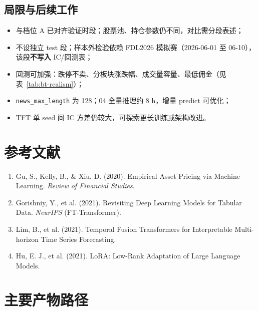 \documentclass[UTF8,a4paper,12pt]{ctexart}
\begin{document}
\subsection{局限与后续工作}

\begin{itemize}[leftmargin=2em]
  \item 与档位 A 已对齐验证时段；股票池、持仓参数仍不同，对比需分段表述；
  \item 不设独立 test 段；样本外检验依赖 FDL2026 模拟赛（2026-06-01 至 06-10），该段\textbf{不写入} IC/回测表；
  \item 回测可加强：跌停不卖、分板块涨跌幅、成交量容量、最低佣金（见表~\ref{tab:bt-realism}）；
  \item \texttt{news\_max\_length} 为 128；04 全量推理约 8 h，增量 predict 可优化；
  \item TFT 单 seed 间 IC 方差仍较大，可探索更长训练或架构改进。
\end{itemize}

\section*{参考文献}
\begin{enumerate}[leftmargin=2em]
  \item Gu, S., Kelly, B., \& Xiu, D. (2020). Empirical Asset Pricing via Machine Learning. \textit{Review of Financial Studies}.
  \item Gorishniy, Y., et al. (2021). Revisiting Deep Learning Models for Tabular Data. \textit{NeurIPS} (FT-Transformer).
  \item Lim, B., et al. (2021). Temporal Fusion Transformers for Interpretable Multi-horizon Time Series Forecasting.
  \item Hu, E. J., et al. (2021). LoRA: Low-Rank Adaptation of Large Language Models.
\end{enumerate}

\section{主要产物路径}
\end{document}
